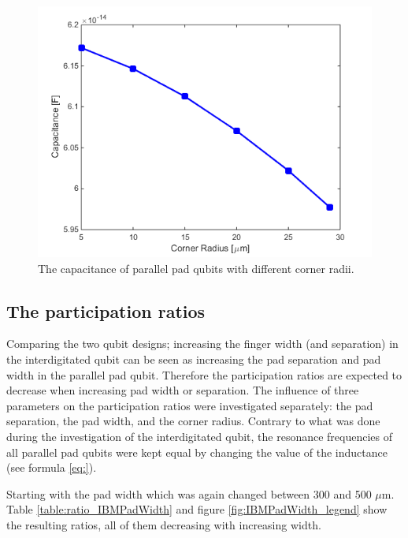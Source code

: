 \begin{figure}
	\centering
	\includegraphics[scale = 0.7]{Figures/Capacitance_plots/IBMCapVSCornerRadius}
	\caption{The capacitance of parallel pad qubits with different corner radii.}
	\label{fig:IBMCapVSCornerRadius}
\end{figure}

\clearpage
\subsection{The participation ratios}
 Comparing the two qubit designs; increasing the finger width (and separation) in the interdigitated qubit can be seen as increasing the pad separation and pad width in the parallel pad qubit. Therefore the participation ratios are expected to decrease when increasing pad width or separation. The influence of three parameters on the participation ratios were investigated separately: the pad separation, the pad width, and the corner radius. Contrary to what was done during the investigation of the interdigitated qubit, the resonance frequencies of all parallel pad qubits were kept equal by changing the value of the inductance (see formula \eqref{eq:}). 
 
 Starting with the pad width which was again changed between 300 and 500 \(\mu\)m. Table \ref{table:ratio_IBMPadWidth} and figure \ref{fig:IBMPadWidth_legend} show the resulting ratios, all of them decreasing with increasing width.
 
